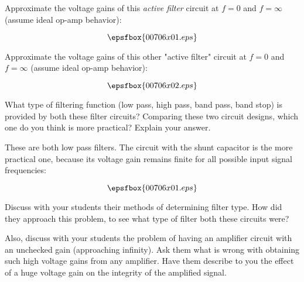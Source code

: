 

Approximate the voltage gains of this {\it active filter} circuit at $f = 0$ and $f = \infty$ (assume ideal op-amp behavior):

$$\epsfbox{00706x01.eps}$$

\vskip 10pt

Approximate the voltage gains of this other "active filter" circuit at $f = 0$ and $f = \infty$ (assume ideal op-amp behavior):

$$\epsfbox{00706x02.eps}$$

\vskip 10pt

What type of filtering function (low pass, high pass, band pass, band stop) is provided by both these filter circuits?  Comparing these two circuit designs, which one do you think is more practical?  Explain your answer.







These are both low pass filters.  The circuit with the shunt capacitor is the more practical one, because its voltage gain remains finite for all possible input signal frequencies:

$$\epsfbox{00706x01.eps}$$







Discuss with your students their methods of determining filter type.  How did they approach this problem, to see what type of filter both these circuits were?

Also, discuss with your students the problem of having an amplifier circuit with an unchecked gain (approaching infinity).  Ask them what is wrong with obtaining such high voltage gains from any amplifier.  Have them describe to you the effect of a huge voltage gain on the integrity of the amplified signal.




